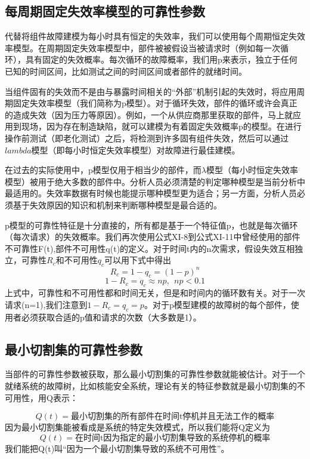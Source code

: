 \documentclass[cn,11pt,chinese]{elegantbook}
\begin{document}
{\subsection{每周期固定失效率模型的可靠性参数}

代替将组件故障建模为每小时具有恒定的失效率，我们可以使用每个周期恒定失效率模型。在周期固定失效率模型中，部件被被假设当被请求时（例如每一次循环），具有固定的失效概率。每次循环的故障概率，我们用p来表示，独立于任何已知的时间区间，比如测试之间的时间区间或者部件的就绪时间。

当组件固有的失效而不是由与暴露时间相关的“外部”机制引起的失效时，将应用周期固定失效率模型（我们简称为p模型）。对于循环失效，部件的循环或许会真正的造成失效（因为压力等原因）。例如，一个从供应商那里获取的部件，马上就应用到现场，因为存在制造缺陷，就可以建模为有着固定失效概率p的模型。在进行操作前测试（即老化测试）之后，将检测到许多固有组件失效，然后可以通过$lambda$模型（即每小时恒定失效率模型）对故障进行最佳建模。

在过去的实际使用中，p模型仅用于相当少的部件，而$\lambda$模型（每小时恒定失效率模型）被用于绝大多数的部件中。分析人员必须清楚的判定哪种模型是当前分析中最适用的。失效率数据有时候也能提示哪种模型更为适合；另一方面，分析人员必须基于失效原因的知识和机制来判断哪种模型是最合适的。

p模型的可靠性特征是十分直接的，所有都是基于一个特征值p，也就是每次循环（每次请求）的失效概率。我们再次使用公式XI-8到公式XI-11中曾经使用的部件不可靠性F(t),部件不可用性q(t)的定义。对于时间t内的n次需求，假设失效互相独立，可靠性$R_c$和不可用性$q_c$可以用下式中得出
$$R_c=1-q_c=(1-p)^n$$
$$1-R_c=q_c \approx np, \ \ np<0.1$$
上式中，可靠性和不可用性都和时间无关，但是和时间内的循环数有关。对于一次请求(n=1),我们注意到$1-R_c=q_c=p$。对于p模型建模的故障树的每个部件，使用者必须获取合适的p值和请求的次数（大多数是1）。

\subsection{最小切割集的可靠性参数}

当部件的可靠性参数被获取，那么最小切割集的可靠性参数就能被估计。对于一个就绪系统的故障树，比如核能安全系统，理论有关的特征参数就是最小切割集的不可用性，用Q表示：

\begin{equation}\label{eq11-22}
Q(t)=\mbox{最小切割集的所有部件在时间t停机并且无法工作的概率} 
\end{equation}
因为最小切割集能被看成是系统的特定失效模式，所以我们能将Q定义为
\begin{equation}\label{eq11-23}
Q(t)=\mbox{在时间t因为指定的最小切割集导致的系统停机的概率} 
\end{equation}
我们能把Q(t)叫“因为一个最小切割集导致的系统不可用性”。

}
\end{document}
